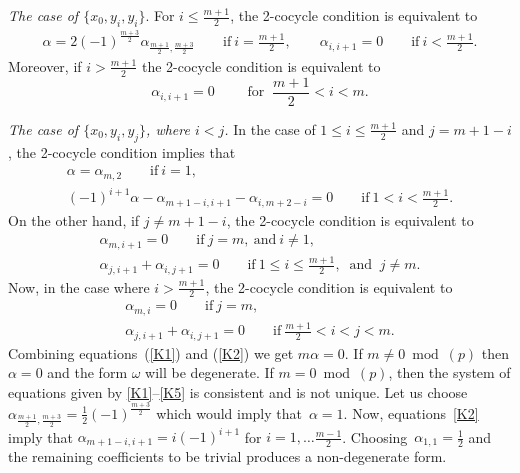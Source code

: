 \documentclass[10pt,a4paper]{amsart}
\numberwithin{equation}{section}
\begin{document}
\textit{The case of $\{x_0, y_i, y_i\}$}. For $i \leq \frac{m+1}{2}$, the 2-cocycle condition is equivalent to
\begin{gather}
\alpha = 2(-1)^{\frac{m+3}{2}} \alpha_{\frac{m+1}{2}, \frac{m+3}{2}}\qquad \text{if} \ i=\frac{m+1}{2},\qquad
\alpha_{i,i+1} = 0\qquad \text{if}\ i < \frac{m+1}{2}.\label{K1}
\end{gather}
Moreover, if $i> \frac{m+1}{2}$ the 2-cocycle condition is equivalent to
\[%
\alpha_{i,i+1}=0 \qquad \text{ for } \ \frac{m+1}{2} < i <m.
\]

\textit{The case of $\{x_0, y_i, y_j\}$, where $i<j$.} In the case of $1\leq i \leq \frac{m+1}{2}$ and $j=m+1-i$, the 2-cocycle condition implies that
\begin{gather}
\alpha = \alpha_{m,2} \qquad \text{if}\ i=1,\nonumber \\
(-1)^{i+1}\alpha - \alpha_{m+1-i,i+1}-\alpha_{i,m+2-i} = 0 \qquad \text{if}\ 1<i<\frac{m+1}{2}.\label{K2}
\end{gather}
On the other hand, if $j \neq m+1-i$, the 2-cocycle condition is equivalent to
\begin{gather*}%
\alpha_{m,i+1} = 0\qquad \text{if}\ j=m, \ \text{and}\ i\not = 1,\\
\alpha_{j,i+1}+ \alpha_{i,j+1} = 0 \qquad \text{if} \ 1\leq i \leq \frac{m+1}{2}, \ \text{ and }\ j\not = m.
\end{gather*}
Now, in the case where $i> \frac{m+1}{2}$, the 2-cocycle condition is equivalent to
\begin{gather}
\alpha_{m,i} = 0 \qquad \text{if} \ j=m,\nonumber \\
\alpha_{j,i+1} + \alpha_{i,j+1} = 0 \qquad \text{if} \ \frac{m+1}{2} < i<j<m.\label{K5}
\end{gather}
Combining equations~(\ref{K1}) and (\ref{K2}) we get $m \alpha=0$. If $m \not =0 \bmod(p)$ then $\alpha=0$ and the form $\omega$ will be degenerate. If $m =0 \bmod(p)$, then the system of equations given by \eqref{K1}--\eqref{K5} is consistent and is not unique. Let us choose $\alpha_{\frac{m+1}{2}, \frac{m+3}{2}}=\frac{1}{2} (-1)^{\frac{m+3}{2}}$ which would imply that~$\alpha=1$. Now, equations~\eqref{K2} imply that $\alpha_{m+1-i, i+1}=i (-1)^{i+1}$ for $i=1,\ldots \frac{m-1}{2}$. Choosing~$\alpha_{1,1}=\frac{1}{2}$ and the remaining coefficients to be trivial produces a non-degenerate form.
\end{document}

